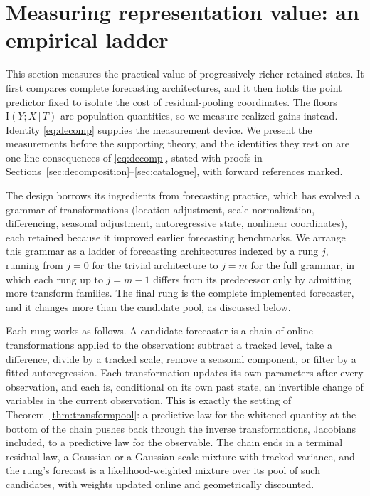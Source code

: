 \documentclass[11pt]{article}
\theoremstyle{remark}
\newcommand{\I}{\mathrm{I}}
\newcommand{\given}{\,|\,}
\begin{document}
\section{Measuring representation value: an empirical ladder}\label{sec:ladder}

This section measures the practical value of progressively richer retained states. It first
compares complete forecasting architectures, and it then holds the point predictor fixed to
isolate the cost of residual-pooling coordinates. The floors $\I(Y;X\given T)$ are
population quantities, so we measure realized gains instead. Identity \eqref{eq:decomp} supplies the measurement device. We present
the measurements before the supporting theory, and the identities they rest on are one-line
consequences of \eqref{eq:decomp}, stated with proofs in
Sections~\ref{sec:decomposition}--\ref{sec:catalogue}, with forward references marked.

The design borrows its ingredients from forecasting practice, which has evolved a grammar of
transformations (location adjustment, scale normalization, differencing, seasonal adjustment,
autoregressive state, nonlinear coordinates), each retained because it improved earlier forecasting benchmarks. We arrange this grammar as a
ladder of forecasting architectures indexed by a rung $j$, running from $j=0$ for the trivial
architecture to $j=m$ for the full grammar, in which each rung up to $j=m-1$ differs from its predecessor only by admitting more
transform families. The final rung is the complete implemented forecaster, and it changes more than
the candidate pool, as discussed below.

Each rung works as follows. A candidate forecaster is a chain of online transformations
applied to the observation: subtract a tracked level, take a difference, divide by a tracked
scale, remove a seasonal component, or filter by a fitted autoregression. Each transformation
updates its own parameters after every observation, and each is, conditional on its own past
state, an invertible change of variables in the current observation. This is exactly the
setting of Theorem~\ref{thm:transformpool}: a predictive law for the whitened quantity at
the bottom of the chain pushes back through the inverse transformations, Jacobians included,
to a predictive law for the observable. The chain ends in a terminal residual law, a Gaussian
or a Gaussian scale mixture with tracked variance, and the rung's forecast is a
likelihood-weighted mixture over its pool of such candidates, with weights updated online and geometrically discounted.
\end{document}
